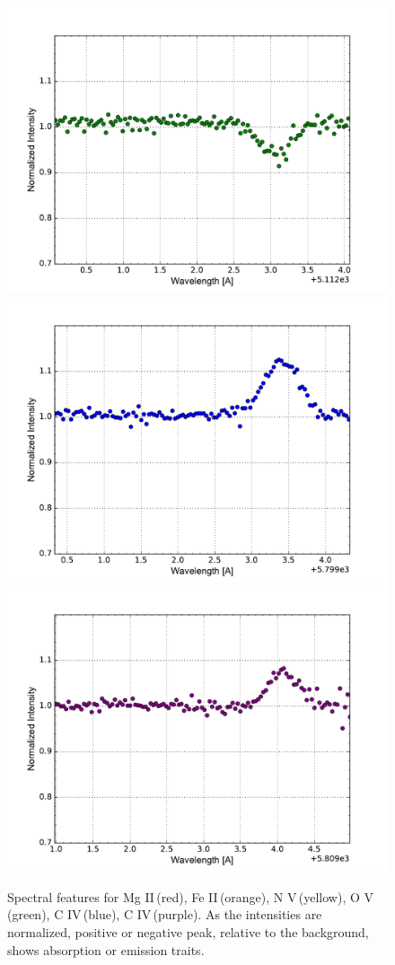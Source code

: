 \documentclass[onecolumn]{aastex6}
\begin{document}
\begin{figure}[ht]
  \includegraphics[scale=0.3]{oV.pdf}%
  \includegraphics[scale=0.3]{cIV.pdf}%
  \includegraphics[scale=0.3]{cIV_2.pdf}%


  \caption{Spectral features for Mg II\,(red), Fe II\,(orange), N V\,(yellow), O V\,(green), C IV\,(blue), C IV\,(purple). As the intensities are normalized, positive or negative peak, relative to the background, shows absorption or emission traits.}
  \label{distancevel}
\end{figure}
\end{document}
